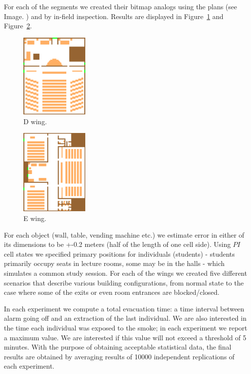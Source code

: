 For each of the segments we created their bitmap analogs using the plans
(see Image. ) and by in-field inspection.
Results are displayed in Figure~\ref{fig:dwing}
and Figure~\ref{fig:ewing}.

\begin{figure}
    \includegraphics[width=0.3\textwidth]{figures/D.eps}
    \caption{D wing.}
    \label{fig:dwing}
\end{figure}

\begin{figure}
    \includegraphics[width=0.3\textwidth]{figures/E.eps}
    \caption{E wing.}
    \label{fig:ewing}
\end{figure}

For each object (wall, table, vending machine etc.) we estimate error in either
of its dimensions to be +-0.2 meters (half of the length of one cell side).
Using $PI$ cell states we specified primary positions for individuals
(students) - students primarily occupy seats in lecture rooms, some may be in
the halls - which simulates a common study session.
For each of the wings we created five different scenarios that describe
various building configurations, from normal state to the case where some of
the exits or even room entrances are blocked/closed.

In each experiment we compute a total evacuation time: a time interval between
alarm going off and an extraction of the last individual.
We are also interested in the time each individual was exposed to the smoke;
in each experiment we report a maximum value.
We are interested if this value will not exceed a threshold of 5 minutes.
With the purpose of obtaining acceptable statistical data, the final results are
obtained by averaging results of 10000 independent replications of each
experiment.

